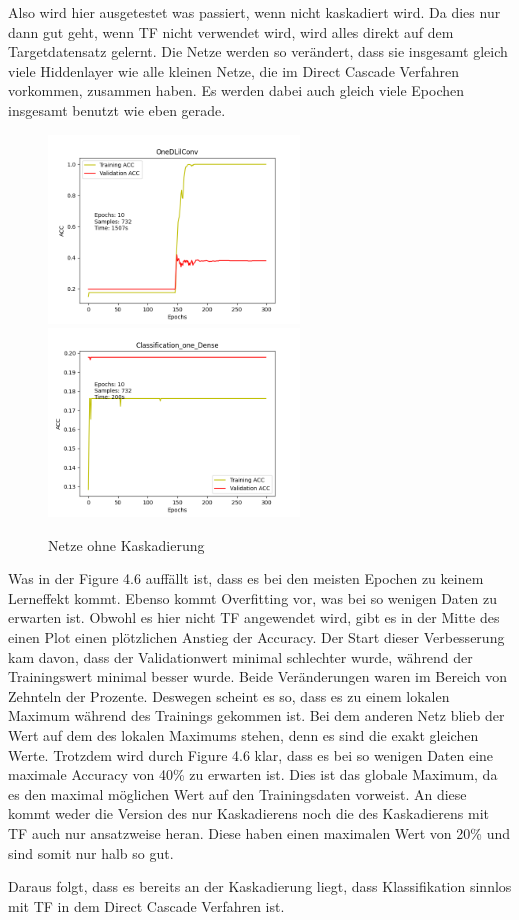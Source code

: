 Also wird hier ausgetestet was passiert, wenn nicht kaskadiert wird. Da dies nur dann gut geht, wenn TF nicht verwendet wird, wird alles direkt 
auf dem Targetdatensatz gelernt. Die Netze werden so verändert, dass sie insgesamt gleich viele Hiddenlayer wie alle kleinen Netze, die im 
Direct Cascade Verfahren vorkommen, zusammen haben. Es werden dabei auch gleich viele Epochen insgesamt benutzt wie eben gerade. 

\begin{figure}[htpb]
    \includegraphics[height=5cm]{../../Plots/ba_plots/classnocascade/1dc.png}
    \includegraphics[height=5cm]{../../Plots/ba_plots/classnocascade/cod.png}
    \caption{\label{fig:nocascade} Netze ohne Kaskadierung}
\end{figure}


Was in der Figure 4.6 auffällt ist, dass es bei den meisten Epochen zu keinem Lerneffekt kommt. Ebenso kommt Overfitting vor, was bei so wenigen 
Daten zu erwarten ist. Obwohl es hier nicht TF angewendet wird, gibt es in der Mitte des einen Plot einen plötzlichen Anstieg der Accuracy. 
Der Start dieser Verbesserung kam davon, dass der Validationwert minimal schlechter wurde, während der Trainingswert minimal besser wurde. 
Beide Veränderungen waren im Bereich von Zehnteln der Prozente. 
Deswegen scheint es so, dass es zu einem lokalen Maximum während des Trainings gekommen ist. Bei dem anderen Netz blieb der Wert auf dem des 
lokalen Maximums stehen, denn es sind die exakt gleichen Werte. Trotzdem wird durch Figure 4.6 klar, dass es bei so wenigen Daten eine maximale 
Accuracy von 40\% zu erwarten ist. Dies ist das globale Maximum, da es den maximal möglichen Wert auf den Trainingsdaten vorweist. 
An diese kommt weder die Version des nur Kaskadierens noch die des Kaskadierens mit TF auch nur 
ansatzweise heran. Diese haben einen maximalen Wert von 20\% und sind somit nur halb so gut. 

Daraus folgt, dass es bereits an der Kaskadierung liegt, dass Klassifikation sinnlos mit TF in dem Direct Cascade Verfahren ist. 
